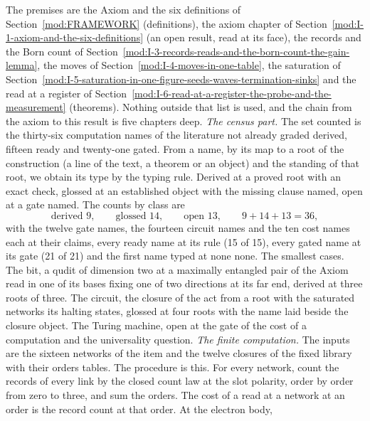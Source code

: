\begin{chproof}
The premises are the Axiom and the six definitions of Section~\ref{mod:FRAMEWORK} (definitions), the axiom chapter of Section~\ref{mod:I-1-axiom-and-the-six-definitions} (an open result, read at its face), the records and the Born count of Section~\ref{mod:I-3-records-reads-and-the-born-count-the-gain-lemma}, the moves of Section~\ref{mod:I-4-moves-in-one-table}, the saturation of Section~\ref{mod:I-5-saturation-in-one-figure-seeds-waves-termination-sinks} and the read at a register of Section~\ref{mod:I-6-read-at-a-register-the-probe-and-the-measurement} (theorems). Nothing outside that list is used, and the chain from the axiom to this result is five chapters deep.
\emph{The census part.} The set counted is the thirty-six computation names of the literature not already graded derived, fifteen ready and twenty-one gated. From a name, by its map to a root of the construction (a line of the text, a theorem or an object) and the standing of that root, we obtain its type by the typing rule. Derived at a proved root with an exact check, glossed at an established object with the missing clause named, open at a gate named. The counts by class are
\begin{equation}
\text{derived } 9, \qquad \text{glossed } 14, \qquad \text{open } 13, \qquad 9 + 14 + 13 = 36 ,
\end{equation}
with the twelve gate names, the fourteen circuit names and the ten cost names each at their claims, every ready name at its rule (15 of 15), every gated name at its gate (21 of 21) and the first name typed at none none. The smallest cases. The bit, a qudit of dimension two at a maximally entangled pair of the Axiom read in one of its bases fixing one of two directions at its far end, derived at three roots of three. The circuit, the closure of the act from a root with the saturated networks its halting states, glossed at four roots with the name laid beside the closure object. The Turing machine, open at the gate of the cost of a computation and the universality question.
\emph{The finite computation.} The inputs are the sixteen networks of the item and the twelve closures of the fixed library with their orders tables. The procedure is this. For every network, count the records of every link by the closed count law at the slot polarity, order by order from zero to three, and sum the orders. The cost of a read at a network at an order is the record count at that order. At the electron body,
\begin{equation}

\end{equation}
\end{chproof}
